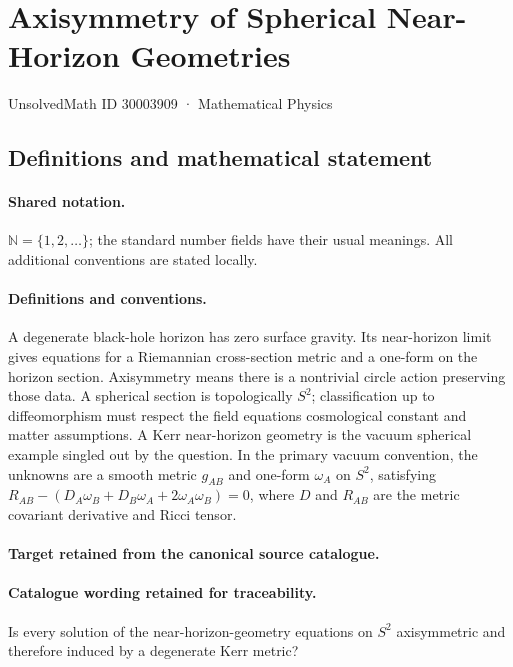 \documentclass[11pt]{article}
\begin{document}
\setcounter{section}{30003908}
\section{Axisymmetry of Spherical Near-Horizon Geometries}\label{30003909}
{\small UnsolvedMath ID 30003909 · Mathematical Physics}
\subsection{Definitions and mathematical statement}

\paragraph{Shared notation.}$\mathbb N=\{1,2,\ldots\}$; the standard number fields have their usual meanings. All additional conventions are stated locally.


\paragraph{Definitions and conventions.}
A degenerate black-hole horizon has zero surface gravity. Its near-horizon limit gives equations for a Riemannian cross-section metric and a one-form on the horizon section. Axisymmetry means there is a nontrivial circle action preserving those data. A spherical section is topologically $S^2$; classification up to diffeomorphism must respect the field equation\textquotesingle s cosmological constant and matter assumptions. A Kerr near-horizon geometry is the vacuum spherical example singled out by the question. In the primary vacuum convention, the unknowns are a smooth metric $g_{AB}$ and one-form $\omega_A$ on $S^2$, satisfying $R_{AB}-(D_A\omega_B+D_B\omega_A+2\omega_A\omega_B)=0$, where $D$ and $R_{AB}$ are the metric covariant derivative and Ricci tensor.

\paragraph{Target retained from the canonical source catalogue.}
\paragraph{Catalogue wording retained for traceability.}
Is every solution of the near-horizon-geometry equations on $S^2$ axisymmetric and therefore induced by a degenerate Kerr metric?
\end{document}
